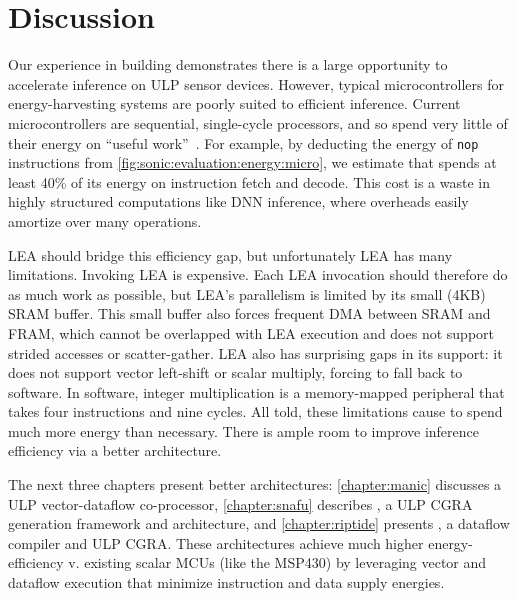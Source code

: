 \section{Discussion}
\label{sonic:discuss}
Our experience in building \sonictails demonstrates there is a large
opportunity to accelerate inference on ULP sensor devices.
% 
However, typical microcontrollers for energy-harvesting systems are poorly
suited to efficient inference.
% 
Current microcontrollers are sequential, single-cycle processors,
and so spend very little of their energy on ``useful work''~\cite{horowitz:isscc14:energy-keynote}.
%
For example, by deducting the energy of \texttt{nop} instructions from \autoref{fig:sonic:evaluation:energy:micro},
we estimate that \sonic spends at least 40\% of its energy on instruction fetch and decode.
%
This cost is a waste in highly structured computations like DNN inference,
where overheads easily amortize over many operations. %

LEA should bridge this efficiency gap, but unfortunately LEA has many limitations.
%
Invoking LEA is expensive. Each LEA invocation should therefore do as much work as
possible, but LEA's parallelism is limited by its small (4KB) SRAM buffer.
%
This small buffer also forces frequent DMA between SRAM and FRAM,
which cannot be overlapped with LEA execution
and does not support strided accesses or scatter-gather.
%
LEA also has surprising gaps in its support:
it does not support vector left-shift or scalar multiply,
forcing \tails to fall back to software.
%
In software, integer multiplication is a memory-mapped peripheral that takes
four instructions and nine cycles.
%
All told, these limitations cause \sonictails to spend much more energy than necessary.
% 
There is ample room to improve inference efficiency via a better architecture.


The next three chapters present better architectures: \autoref{chapter:manic} discusses \manic a ULP vector-dataflow co-processor, \autoref{chapter:snafu} describes \snafu, a ULP CGRA generation framework and architecture, and \autoref{chapter:riptide} presents \riptide, a dataflow compiler and ULP CGRA.
% 
These architectures achieve much higher energy-efficiency v. existing scalar MCUs (like the MSP430) by leveraging vector and dataflow execution that minimize instruction and data supply energies.

